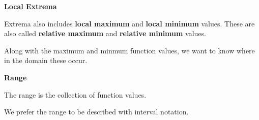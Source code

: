 \documentclass{ximera}
\begin{document}
\begin{explanation}  \textbf{\textcolor{red!75!green}{Local Extrema}} 

Extrema also includes \textbf{\textcolor{purple!85!blue}{local maximum}} and \textbf{\textcolor{purple!85!blue}{local minimum}} values. These are also called \textbf{\textcolor{purple!85!blue}{relative maximum}} and \textbf{\textcolor{purple!85!blue}{relative minimum}} values.  


Along with the maximum and minmum function values, we want to know where in the domain these occur.


\end{explanation}






\begin{explanation}  \textbf{\textcolor{red!75!green}{Range}} 

The range is the collection of function values. 

We prefer the range to be described with interval notation.

\end{explanation}
\end{document}
